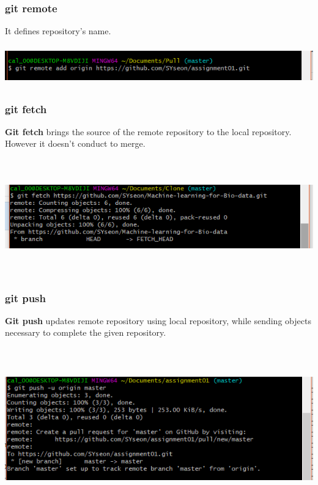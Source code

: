 \documentclass[11pt]{article}
\begin{document}
		\subsubsection{git remote}
		It defines repository's name.
		
		\includegraphics[height=1.7cm, width=14cm]{gitremote.PNG}
		
		\subsubsection{git fetch}
		\textbf{Git fetch} brings the source of the remote repository to the local repository. However it doesn't conduct to merge. 
		
		
		\includegraphics[height=5cm, width=14cm]{gitfetch.PNG}
		
		
		\subsubsection{git push}
		\textbf{Git push} updates remote repository using local repository, while sending objects necessary to complete the given repository.
		
		\includegraphics[height=7cm, width=14cm]{gitpush.PNG}
\end{document}

